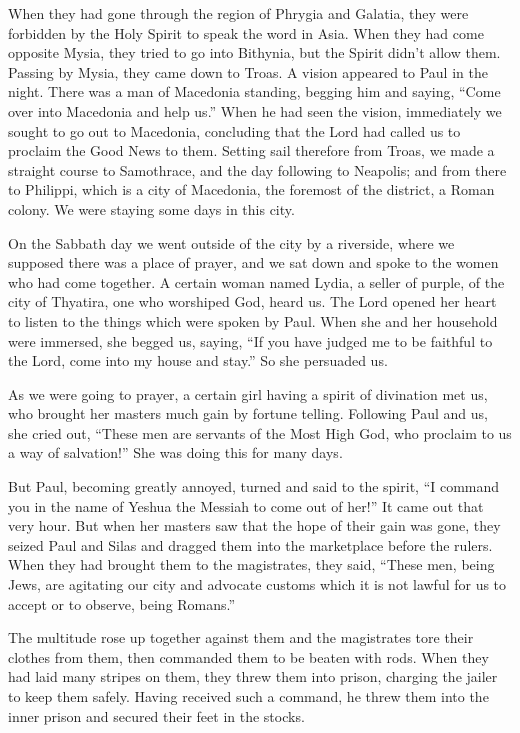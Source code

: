 \myverse{}When they had gone through the region of Phrygia and Galatia,
they were forbidden by the Holy Spirit to speak the word in Asia.
\myverse{}When they had come opposite Mysia, they tried to go into Bithynia, but the
Spirit didn’t allow them.
\myverse{}Passing by Mysia, they came down to Troas.
\myverse{}A vision appeared to Paul in the night. There was a man of Macedonia standing,
begging him and saying, “Come over into Macedonia and help us.”
\myverse{}When he had seen the vision, immediately we sought to go out to Macedonia,
concluding that the Lord had called us to proclaim the Good News to them.
\myverse{}Setting sail therefore from Troas, we made a straight course to Samothrace,
and the day following to Neapolis;
\myverse{}and from there to Philippi, which is a city of Macedonia, the foremost of
the district, a Roman colony. We were staying some days in this city.

\myverse{}On the Sabbath day we went outside of the city by a riverside,
where we supposed there was a place of prayer, and we sat down and spoke to the women who had come together.
\myverse{}A certain woman named Lydia, a seller of purple, of the city of Thyatira,
one who worshiped God, heard us. The Lord opened her heart to listen to the things which were spoken by
Paul.
\myverse{}When she and her household were immersed, she begged us, saying, “If you
have judged me to be faithful to the Lord, come into my house and stay.” So she persuaded us.

\myverse{}As we were going to prayer, a certain girl having a spirit of
divination met us, who brought her masters much gain by fortune telling.
\myverse{}Following Paul and us, she cried out, “These men are servants of the Most
High God, who proclaim to us a way of salvation!”
\myverse{}She was doing this for many days.

But Paul, becoming greatly annoyed, turned and said to the spirit, “I command you in the
name of Yeshua the Messiah to come out of her!” It came out that very hour.
\myverse{}But when her masters saw that the hope of their gain was gone, they seized
Paul and Silas and dragged them into the marketplace before the rulers.
\myverse{}When they had brought them to the magistrates, they said, “These men, being
Jews, are agitating our city
\myverse{}and advocate customs which it is not lawful for us to accept or to observe,
being Romans.”

\myverse{}The multitude rose up together against them and the magistrates
tore their clothes from them, then commanded them to be beaten with rods.
\myverse{}When they had laid many stripes on them, they threw them into prison, charging
the jailer to keep them safely.
\myverse{}Having received such a command, he threw them into the inner prison and secured
their feet in the stocks.

